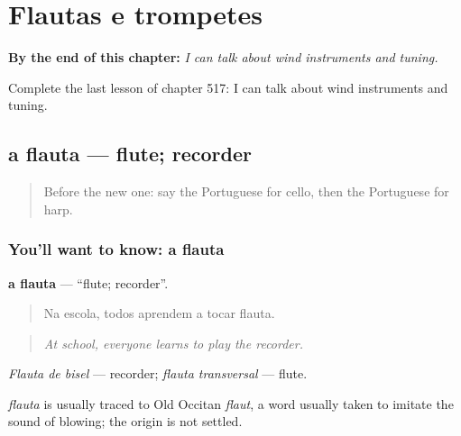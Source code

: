 
\chapter{Flautas e trompetes}
\label{ch:pt-flautas-e-trompetes}

\begin{chapteropening}
\textbf{By the end of this chapter:} \emph{I can talk about wind instruments and tuning.}

Complete the last lesson of chapter 517: I can talk about wind instruments and tuning.
\end{chapteropening}

\section[a flauta]{a flauta — flute; recorder}

\label{lesson:PT-C517-flauta}



\begin{quote}
Before the new one: say the Portuguese for cello, then the Portuguese for harp.
\end{quote}

\subsection*{You'll want to know: a flauta}
\textbf{a flauta} — \textquotedblleft{}flute; recorder\textquotedblright{}.

\begin{quote}
Na escola, todos aprendem a tocar flauta.
\end{quote}

\begin{quote}
\emph{At school, everyone learns to play the recorder.}
\end{quote}

\emph{Flauta de bisel} — recorder; \emph{flauta transversal} — flute.

\begin{cousinweb}
\emph{flauta} is usually traced to Old Occitan \emph{flaut}, a word usually taken to imitate the sound of blowing; the origin is not settled.
\end{cousinweb}

